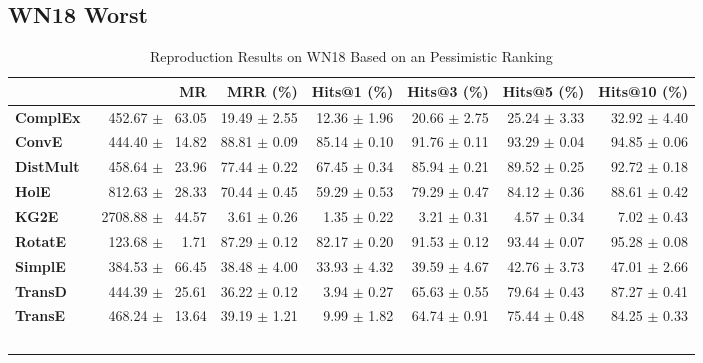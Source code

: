 \documentclass[journal]{IEEEtran}
\begin{document}
\subsection{WN18 Worst}
    \begin{table*}
        \caption{Reproduction Results on WN18 Based on an Pessimistic Ranking}
        \label{tab:wn18_full_results_pessimistic_ranking}
        \centering
        \begin{tabular}{lrrrrrr}
\toprule
{} &                 MR &      MRR (\%) &   Hits@1 (\%) &   Hits@3 (\%) &   Hits@5 (\%) &  Hits@10 (\%) \\
\midrule
\textbf{ComplEx } &  $\phantom{5}$$\phantom{5}$452.67 $\pm$ $\phantom{5}$63.05 &  19.49 $\pm$ 2.55 &  12.36 $\pm$ 1.96 &  20.66 $\pm$ 2.75 &  25.24 $\pm$ 3.33 &  32.92 $\pm$ 4.40 \\
\textbf{ConvE   } &  $\phantom{5}$$\phantom{5}$444.40 $\pm$ $\phantom{5}$14.82 &  88.81 $\pm$ 0.09 &  85.14 $\pm$ 0.10 &  91.76 $\pm$ 0.11 &  93.29 $\pm$ 0.04 &  94.85 $\pm$ 0.06 \\
\textbf{DistMult} &  $\phantom{5}$$\phantom{5}$458.64 $\pm$ $\phantom{5}$23.96 &  77.44 $\pm$ 0.22 &  67.45 $\pm$ 0.34 &  85.94 $\pm$ 0.21 &  89.52 $\pm$ 0.25 &  92.72 $\pm$ 0.18 \\
\textbf{HolE    } &  $\phantom{5}$$\phantom{5}$812.63 $\pm$ $\phantom{5}$28.33 &  70.44 $\pm$ 0.45 &  59.29 $\pm$ 0.53 &  79.29 $\pm$ 0.47 &  84.12 $\pm$ 0.36 &  88.61 $\pm$ 0.42 \\
\textbf{KG2E    } &  $\phantom{5}$2708.88 $\pm$ $\phantom{5}$44.57 &  $\phantom{5}$3.61 $\pm$ 0.26 &  $\phantom{5}$1.35 $\pm$ 0.22 &  $\phantom{5}$3.21 $\pm$ 0.31 &  $\phantom{5}$4.57 $\pm$ 0.34 &  $\phantom{5}$7.02 $\pm$ 0.43 \\
\textbf{RotatE  } &  $\phantom{5}$$\phantom{5}$123.68 $\pm$ $\phantom{5}$$\phantom{5}$1.71 &  87.29 $\pm$ 0.12 &  82.17 $\pm$ 0.20 &  91.53 $\pm$ 0.12 &  93.44 $\pm$ 0.07 &  95.28 $\pm$ 0.08 \\
\textbf{SimplE  } &  $\phantom{5}$$\phantom{5}$384.53 $\pm$ $\phantom{5}$66.45 &  38.48 $\pm$ 4.00 &  33.93 $\pm$ 4.32 &  39.59 $\pm$ 4.67 &  42.76 $\pm$ 3.73 &  47.01 $\pm$ 2.66 \\
\textbf{TransD  } &  $\phantom{5}$$\phantom{5}$444.39 $\pm$ $\phantom{5}$25.61 &  36.22 $\pm$ 0.12 &  $\phantom{5}$3.94 $\pm$ 0.27 &  65.63 $\pm$ 0.55 &  79.64 $\pm$ 0.43 &  87.27 $\pm$ 0.41 \\
\textbf{TransE  } &  $\phantom{5}$$\phantom{5}$468.24 $\pm$ $\phantom{5}$13.64 &  39.19 $\pm$ 1.21 &  $\phantom{5}$9.99 $\pm$ 1.82 &  64.74 $\pm$ 0.91 &  75.44 $\pm$ 0.48 &  84.25 $\pm$ 0.33 \\
$$
\end{tabular}
\end{table*}
\end{document}
